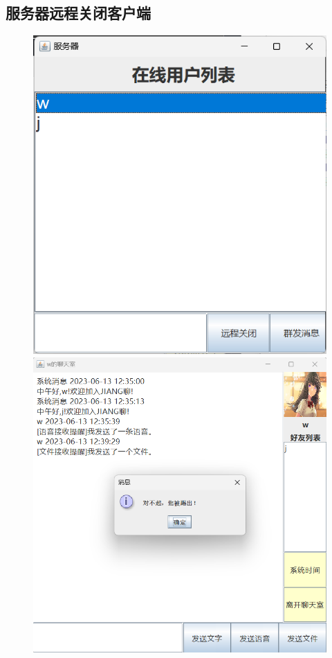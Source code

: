 \documentclass[UTF8,12pt]{article}
\begin{document}
\newpage

\subsection{服务器远程关闭客户端}
\begin{figure}[htbp]
    \centering
    \begin{minipage}{0.4\textwidth}
        \centering
        \includegraphics[width=1.0\textwidth]{img/25.png}
    \end{minipage}
    \begin{minipage}{0.4\textwidth}
        \centering
        \includegraphics[width=1.0\textwidth]{img/26.png}

\end{minipage}
\end{figure}
\end{document}
